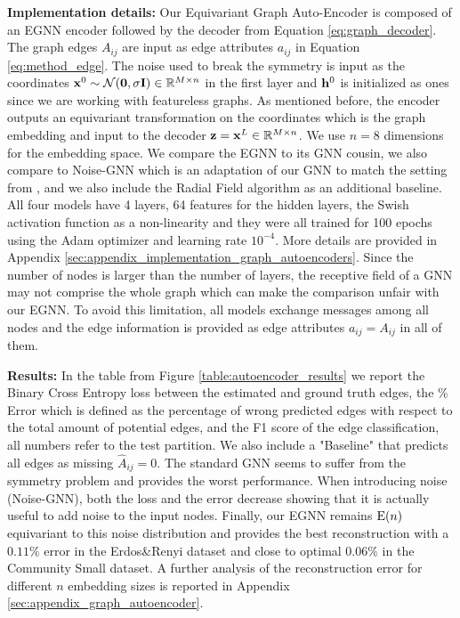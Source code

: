 \textbf{Implementation details:} Our Equivariant Graph Auto-Encoder is composed of an EGNN encoder followed by the decoder from Equation \ref{eq:graph_decoder}. The graph edges $A_{ij}$ are input as edge attributes $a_{ij}$ in Equation \ref{eq:method_edge}. The noise used to break the symmetry is input as the coordinates $\mathbf{x}^0 \sim \mathcal{N(\mathbf{0}, \sigma\mathbf{I})} \in \mathbb{R}^{M \times n}$ in the first layer and $\mathbf{h}^0$ is initialized as ones since we are working with featureless graphs. As mentioned before, the encoder outputs an equivariant transformation on the coordinates which is the graph embedding and input to the decoder $\mathbf{z} = \mathbf{x}^L \in \mathbb{R}^{M\times n}$. We use $n=8$ dimensions for the embedding space. We compare the EGNN to its GNN cousin, we also compare to Noise-GNN which is an adaptation of our GNN to match the setting from \cite{liu2019graph}, and we also include the Radial Field algorithm as an additional baseline. All four models have 4 layers, 64 features for the hidden layers, the Swish activation function as a non-linearity and they were all trained for 100 epochs using the Adam optimizer and learning rate $10^{-4}$. More details are provided in Appendix \ref{sec:appendix_implementation_graph_autoencoders}. Since the number of nodes is larger than the number of layers, the receptive field of a GNN may not comprise the whole graph which can make the comparison unfair with our EGNN. To avoid this limitation, all models exchange messages among all nodes and the edge information is provided as edge attributes $a_{ij} = A_{ij}$ in all of them.


\textbf{Results:} In the table from Figure \ref{table:autoencoder_results} we report the Binary Cross Entropy loss between the estimated and ground truth edges, the \% Error which is defined as the percentage of wrong predicted edges with respect to the total amount of potential edges, and the F1 score of the edge classification, all numbers refer to the test partition. We also include a "Baseline" that predicts all edges as missing $\hat{A}_{ij}=0$. The standard GNN seems to suffer from the symmetry problem and provides the worst performance. When introducing noise (Noise-GNN), both the loss and the error decrease showing that it is actually useful to add noise to the input nodes. Finally, our EGNN remains $\mathrm{E}(n)$ equivariant to this noise distribution and provides the best reconstruction with a $0.11\%$ error in the Erdos\&Renyi dataset and close to optimal $0.06\%$ in the Community Small dataset. A further analysis of the reconstruction error for different $n$ embedding sizes is reported in Appendix \ref{sec:appendix_graph_autoencoder}. 


